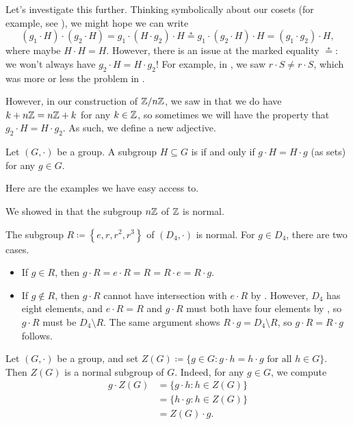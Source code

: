 \documentclass[../main.tex]{subfiles}
\begin{document}
Let's investigate this further. Thinking symbolically about our cosets (for example, see ), we might hope we can write
\begin{equation}
    (g_1\cdot H)\cdot(g_2\cdot H)=g_1\cdot(H\cdot g_2)\cdot H\stackrel*=g_1\cdot(g_2\cdot H)\cdot H=(g_1\cdot g_2)\cdot H, \label{eq:pipe-dream-normal-subgroup}
\end{equation}
where maybe $H\cdot H=H$. However, there is an issue at the marked equality $\stackrel*=$: we won't always have $g_2\cdot H=H\cdot g_2$! For example, in , we saw $r\cdot S\ne r\cdot S$, which was more or less the problem in .

However, in our construction of $\mathbb Z/n\mathbb Z$, we saw in  that we do have $k+n\mathbb Z=n\mathbb Z+k$ for any $k\in\mathbb Z$, so sometimes we will have the property that $g_2\cdot H=H\cdot g_2$. As such, we define a new adjective.
\begin{definition}[normal]
    Let $(G,\cdot)$ be a group. A subgroup $H\subseteq G$ is  if and only if $g\cdot H=H\cdot g$ (as sets) for any $g\in G$.
\end{definition}
Here are the examples we have easy access to.
\begin{example}
    We showed in  that the subgroup $n\mathbb Z$ of $\mathbb Z$ is normal.
\end{example}
\begin{example}
    The subgroup $R\coloneqq\left\{e,r,r^2,r^3\right\}$ of $(D_4,\cdot)$ is normal. For $g\in D_4$, there are two cases.
    \begin{itemize}
        \item If $g\in R$, then $g\cdot R=e\cdot R=R=R\cdot e=R\cdot g$.
        \item If $g\notin R$, then $g\cdot R$ cannot have intersection with $e\cdot R$ by . However, $D_4$ has eight elements, and $e\cdot R=R$ and $g\cdot R$ must both have four elements by , so $g\cdot R$ must be $D_4\setminus R$. The same argument shows $R\cdot g=D_4\setminus R$, so $g\cdot R=R\cdot g$ follows.
    \end{itemize}
\end{example}
\begin{example}
    Let $(G,\cdot)$ be a group, and set $Z(G)\coloneqq\{g\in G:g\cdot h=h\cdot g\text{ for all }h\in G\}$. Then $Z(G)$ is a normal subgroup of $G$. Indeed, for any $g\in G$, we compute
    \begin{align*}
        g\cdot Z(G) &= \{g\cdot h:h\in Z(G)\} \\
        &= \{h\cdot g:h\in Z(G)\} \\
        &= Z(G)\cdot g.
    \end{align*}
\end{example}
\end{document}
